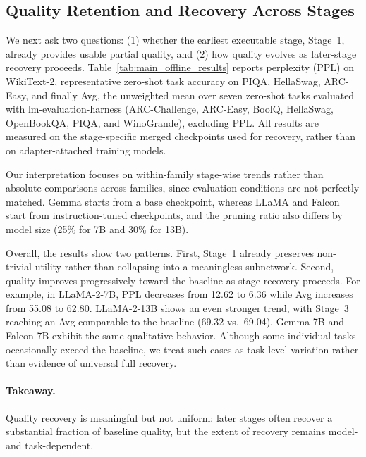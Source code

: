 \documentclass[sigplan,anonymous,review,nonacm]{acmart}
\begin{document}
\subsection{Quality Retention and Recovery Across Stages}
\label{sec:eval-quality}

We next ask two questions: (1) whether the earliest executable stage, Stage~1, already provides usable partial quality, and (2) how quality evolves as later-stage recovery proceeds. Table~\ref{tab:main_offline_results} reports perplexity (PPL) on WikiText-2, representative zero-shot task accuracy on PIQA, HellaSwag, ARC-Easy, and finally Avg, the unweighted mean over seven zero-shot tasks evaluated with lm-evaluation-harness (ARC-Challenge, ARC-Easy, BoolQ, HellaSwag, OpenBookQA, PIQA, and WinoGrande), excluding PPL. All results are measured on the stage-specific merged checkpoints used for recovery, rather than on adapter-attached training models.

Our interpretation focuses on within-family stage-wise trends rather than absolute comparisons across families, since evaluation conditions are not perfectly matched. Gemma starts from a base checkpoint, whereas LLaMA and Falcon start from instruction-tuned checkpoints, and the pruning ratio also differs by model size (25\% for 7B and 30\% for 13B).   

Overall, the results show two patterns. First, Stage~1 already preserves non-trivial utility rather than collapsing into a meaningless subnetwork. Second, quality improves progressively toward the baseline as stage recovery proceeds. For example, in LLaMA-2-7B, PPL decreases from 12.62 to 6.36 while Avg increases from 55.08 to 62.80. LLaMA-2-13B shows an even stronger trend, with Stage~3 reaching an Avg comparable to the baseline (69.32 vs.\ 69.04). Gemma-7B and Falcon-7B exhibit the same qualitative behavior. Although some individual tasks occasionally exceed the baseline, we treat such cases as task-level variation rather than evidence of universal full recovery.

\paragraph{Takeaway.}
Quality recovery is meaningful but not uniform: later stages often recover a substantial fraction of baseline quality, but the extent of recovery remains model- and task-dependent.
\end{document}

